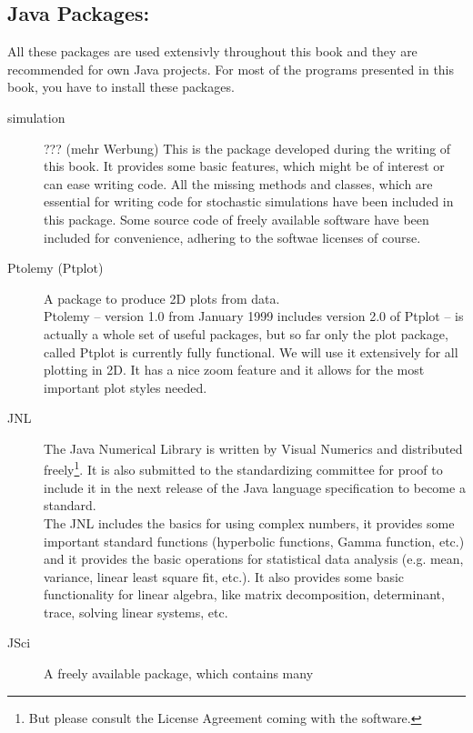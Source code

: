 \subsection{Java Packages:}
All these packages are used extensivly throughout this book and they
are recommended for own Java projects. For most of the programs
presented in this book, you have to install these packages.
\begin{description}
\item[simulation]  ??? (mehr Werbung)
  This is the package developed during the writing
        of this book. It provides some basic features, which
        might be of interest or can ease writing code. All the missing
        methods and classes, which are essential for writing code
        for stochastic simulations have been included in this package.
        Some source
        code of freely available software have been included for
        convenience, adhering to the softwae licenses of course. 
\item[Ptolemy (Ptplot)]  
  A package to produce 2D plots from data. \\
        Ptolemy -- version 1.0 from January 1999 includes version
        2.0 of Ptplot --
        is actually a whole set of useful packages, but so far only the
        plot package, called Ptplot is currently fully functional. We will
        use it extensively for all plotting in 2D. It has a nice
        zoom feature and it allows for the most important plot styles
        needed.
\item[JNL]  
  The Java Numerical Library is written by Visual Numerics and
        distributed freely\footnote{But please consult the License Agreement
        coming with the software.}. It is also submitted to the standardizing
        committee for proof to include it in the next release of the
        Java language specification to become a standard. \\
        The JNL includes the basics for using complex numbers, it
        provides some important standard functions (hyperbolic
        functions, Gamma function, etc.) and it provides 
        the basic operations for statistical data analysis (e.g. mean,
        variance, linear least square fit, etc.). It also provides some
        basic functionality for linear algebra, like matrix decomposition,
        determinant, trace, solving linear systems, etc.
\item[JSci]  A freely available package, which contains many 

\end{description}
